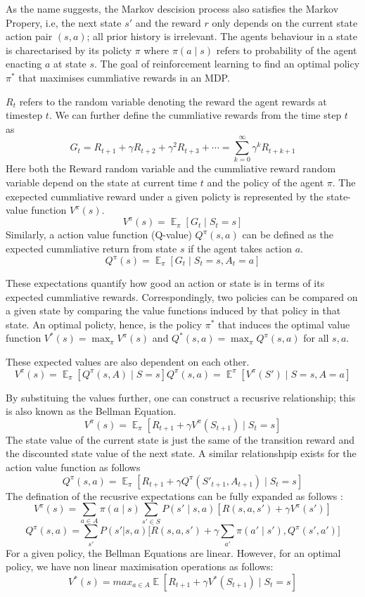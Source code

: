 \documentclass[12pt,a4paper]{report}
\DeclareMathOperator{\EX}{\mathbb{E}}
\begin{document}
As the name suggests, the Markov descision process also satisfies the Markov Propery, i.e, the next state $s'$ and the reward $r$ only depends on the current state action pair $(s, a)$; all prior history is irrelevant. The agents behaviour in a state is charectarised by its policty $\pi$ where $\pi(a \mid s)$ refers to probability of the agent enacting $a$ at state $s$. The goal of reinforcement learning to find an optimal policy $\pi^*$ that maximises cummliative rewards in an MDP.  

$R_{t}$ refers to the random variable denoting the reward the agent rewards at timestep $t$. We can further define the cummliative rewards from the time step $t$ as 
\[G_t = R_{t+1} + \gamma R_{t+2} + \gamma^2 R_{t+3} + \cdots = \sum_{k=0}^{\infty} \gamma^k R_{t+k+1}\]
Here both the Reward random variable and the cummliative reward random variable depend on the state at current time $t$ and the policy of the agent $\pi$. The exepected cummliative reward under a given policty is represented by the state-value function $V^{\pi}(s)$. 
\[
  V^{\pi}(s) = \EX_{\pi}[G_t \mid S_t = s]
\]
Similarly, a action value function (Q-value) $Q^\pi (s, a)$ can be defined as the expected cummliative return from state $s$ if the agent takes action $a$. 
 \[
  Q^{\pi}(s) = \EX_{\pi}[G_t \mid S_t = s, A_t = a]
\]

These expectations quantify how good an action or state is in terms of its expected cummliative rewards. Correspondingly, two policies can be compared on a given state by comparing the value functions induced by that policy in that state. An optimal policty, hence, is the policy $\pi^*$ that induces the optimal value function $V^*(s) = \max_\pi V^\pi(s)$ and $Q^*(s, a) = \max_\pi Q^\pi(s, a)$ for all $s, a$. \par

These expected values are also dependent on each other. 
\[
  V^\pi(s) = \EX_{\pi}[Q^\pi(s, A) \mid S = s]
  Q^\pi(s, a) = \EX^\pi[V^\pi(S') \mid S = s, A = a ]
\] 

By substituing the values further, one can construct a recusrive relationship; this is also known as the Bellman Equation.  
\[
  V^\pi(s) = \EX_{\pi}[ R_{t+1} + \gamma V^\pi(S_{t+1}) \mid S_{t}= s]
\]
The state value of the current state is just the same of the transition reward and the discounted state value of the next state. A similar relationshpip exists for the action value function as follows  
\[
  Q^\pi(s, a) = \EX_{\pi}[ R_{t+1} + \gamma Q^\pi(S'_{t+1}, A_{t+1}) \mid S_{t}= s]
\]
The defination of the recusrive expectations can be fully expanded as follows :
\[V^{\pi}(s) = \sum_{a \in A} \pi(a \mid s) \sum_{s' \in S} P(s' \mid s, a) \left[ R(s, a, s') + \gamma V^{\pi}(s') \right] \] 
\[
Q^\pi(s,a) = \sum_{s'}P(s'|s,a)\big[ R(s,a,s') + \gamma \sum_{a'}\pi(a'\mid s'),Q^\pi(s',a')\big]
\]
For a given policy, the Bellman Equations are linear. However, for an optimal policy, we have non linear maximisation operations as follows: 
\[
  V^*(s) = max_{a \in A}\EX[ R_{t+1} + \gamma V^*(S_{t+1}) \mid S_{t}= s]
\]
\end{document}
